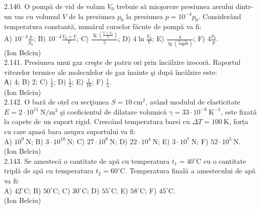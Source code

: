 2.140. O pompă de vid de volum $V_{0}$ trebuie să micşoreze presiunea aerului dintr-un vas cu volumul $V$ de la presiunea $p_{0}$ la presiunea $p=10^{-4} p_{0}$. Considerând temperatura constantă, numărul curselor făcute de pompă va fi:\\ A) $10^{-4} \frac{p}{p_{0}}$; B) $10^{-4} \frac{V_{0}+V}{V}$; C) $\frac{\lg \left(\frac{V+V_{0}}{V}\right)}{5}$; D) $4 \ln \frac{V_{0}}{V}$; E) $\frac{4}{\lg \left(\frac{V+V_{0}}{V}\right)}$; F) $4 \frac{p_{0}}{p}$.\\ (Ion Belciu)\\

2.141. Presiunea unui gaz creşte de patru ori prin încălzire izocoră. Raportul vitezelor termice ale moleculelor de gaz înainte şi după încălzire este:\\ А) 4; B) 2; C) $\frac{1}{4}$; D) $\frac{1}{2}$; E) $\frac{1}{16}$; F) $\frac{1}{5}$.\\ (Ion Belciu)\\

2.142. O bară de oțel cu secţiunea $S=10 \mathrm{~cm}^{2}$, având modulul de elasticitate $E=2 \cdot 10^{11} \mathrm{~N} / \mathrm{m}^{2}$ şi coeficientul de dilatare volumică $\gamma=33 \cdot 10^{-6} \mathrm{~K}^{-1}$, este fixată la capete de un suport rigid. Crescând temperatura barei cu $\Delta T=100 \mathrm{~K}$, forța cu care apasă bara asupra suportului va fi:\\ A) $10^{9} \mathrm{~N}$; B) $3 \cdot 10^{10} \mathrm{~N}$; C) $27 \cdot 10^{8} \mathrm{~N}$; D) $22 \cdot 10^{4} \mathrm{~N}$; E) $3 \cdot 10^{7} \mathrm{~N}$; F) $52 \cdot 10^{5} \mathrm{~N}$.\\ (Ion Belciu)\\

2.143. Se amestecă o cantitate de apă cu temperatura $t_{1}=40^{\circ} \mathrm{C}$ cu o cantitate triplă de apă cu temperatura $t_{2}=60^{\circ} \mathrm{C}$. Temperatura finală a amestecului de apă va fi:\\ A) $42^{\circ} \mathrm{C}$; B) $50^{\circ} \mathrm{C}$; C) $30^{\circ} \mathrm{C}$; D) $55^{\circ} \mathrm{C}$; E) $58^{\circ} \mathrm{C}$; F) $45^{\circ} \mathrm{C}$.\\ (Ion Belciu)\\

